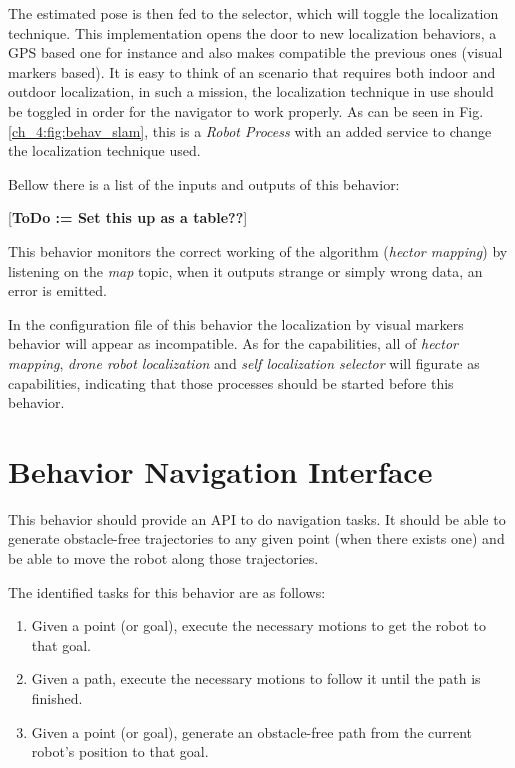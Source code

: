   The estimated pose is then fed to the selector, which will toggle the localization technique. This implementation opens the door to new localization behaviors, a GPS based one for instance and also makes compatible the previous ones (visual markers based). It is easy to think of an scenario that requires both indoor and outdoor localization, in such a mission, the localization technique in use should be toggled in order for the navigator to work properly. As can be seen in Fig. \ref{ch_4:fig:behav_slam}, this is a \textit{Robot Process} with an added service to change the localization technique used.

  Bellow there is a list of the inputs and outputs of this behavior:

  [\textbf{ToDo := Set this up as a table??}]
  

  This behavior monitors the correct working of the algorithm (\textit{hector mapping}) by listening on the \textit{map} topic, when it outputs strange or simply wrong data, an error is emitted.

  In the configuration file of this behavior the localization by visual markers behavior will appear as incompatible. As for the capabilities, all of \textit{hector mapping}, \textit{drone robot localization} and \textit{self localization selector} will figurate as capabilities, indicating that those processes should be started before this behavior.

\section{Behavior Navigation Interface}

This behavior should provide an API to do navigation tasks. It should be able to generate obstacle-free trajectories  to any given point (when there exists one) and be able to move the robot along those trajectories.

\pagebreak

The identified tasks for this behavior are as follows:

\begin{enumerate}
  \item Given a point (or goal), execute the necessary motions to get the robot to that goal.
  \item Given a path, execute the necessary motions to follow it until the path is finished.
  \item Given a point (or goal), generate an obstacle-free path from the current robot's position to that goal.
\end{enumerate}

